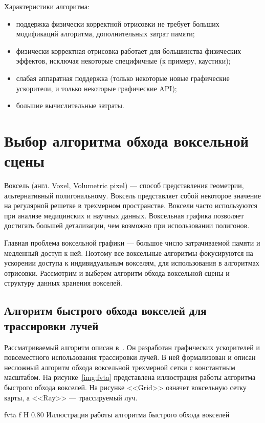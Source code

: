 Характеристики алгоритма:
\begin{itemize}
    \item поддержка физически корректной отрисовки не требует больших модификаций алгоритма,
        дополнительных затрат памяти;
    \item физически корректная отрисовка работает для большинства физических эффектов,
        исключая некоторые специфичные (к примеру, каустики);
    \item слабая аппаратная поддержка (только некоторые новые графические ускорители, и только 
        некоторые графические API);
    \item большие вычислительные затраты.
\end{itemize}

\section{Выбор алгоритма обхода воксельной сцены}

Воксель (англ. Voxel, Volumetric pixel) --- способ представления геометрии, альтернативный
полигональному. Воксель представляет собой некоторое значение на регулярной решетке в 
трехмерном пространстве. Воксели часто используются при анализе медицинских и научных
данных. Воксельная графика позволяет достигать большей детализации,
чем возможно при использовании полигонов. 

Главная проблема воксельной графики --- большое число затрачиваемой памяти и медленный доступ к ней.
Поэтому все воксельные алгоритмы фокусируются на ускорении доступа к индивидуальным вокселям, для
использования в алгоритмах отрисовки. Рассмотрим и выберем алгоритм обхода воксельной сцены и 
структуру данных хранения вокселей.

\subsection{Алгоритм быстрого обхода вокселей для трассировки лучей}

Рассматриваемый алгоритм описан в~\cite{AFVTAfRT}. Он разработан
графических ускорителей и повсеместного использования трассировки лучей. В ней формализован 
и описан несложный алгоритм обхода воксельной трехмерной сетки с константным масштабом.
На рисунке~\ref{img:fvta} представлена иллюстрация работы алгоритма быстрого обхода вокселей.
На рисунке <<Grid>> означет воксельную сетку карты, а <<Ray>> --- трассируемый луч.

    {fvta}
    {f}
    {H}
    {0.80\textwidth}
    {Иллюстрация работы алгоритма быстрого обхода вокселей~\cite{AFVTAfRT}}

